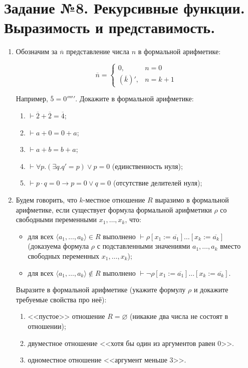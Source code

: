 \documentclass[10pt,a4paper,oneside]{article}
\begin{document}
\section*{Задание №8. Рекурсивные функции. Выразимость и представимость.}
\begin{enumerate}

\item Обозначим за $\overline{n}$ представление числа $n$ в формальной арифметике: %

$$\overline{n} = \left\{\begin{array}{ll}0, &n = 0\\
           \left(\overline{k}\right)', & n=k+1\end{array}\right.$$

Например, $\overline{5} = 0'''''$. Докажите в формальной арифметике:
\begin{enumerate}
\item $\vdash \overline{2} + \overline{2} = \overline{4}$;
\item $\vdash a + 0 = 0 + a$;
\item $\vdash a + b = b + a$;
\item $\vdash \forall p.(\exists q.q' = p) \vee p = 0$ (единственность нуля);
\item $\vdash p \cdot q = 0 \rightarrow p = 0 \vee q = 0$ (отсутствие делителей нуля);
\end{enumerate}

\item Будем говорить, что $k$-местное отношение $R$ выразимо в формальной арифметике,
если существует формула формальной арифметики $\rho$ со свободными переменными $x_1, \dots, x_k$, что:
\begin{itemize}
\item для всех $\langle a_1, \dots, a_k \rangle \in R$ выполнено $\vdash\rho[x_1 := \overline{a_1}]\dots[x_k := \overline{a_k}]$
(доказуема формула $\rho$ с подставленными значениями $a_1, \dots, a_k$ вместо свободных переменных $x_1, \dots, x_k$);
\item для всех $\langle a_1, \dots, a_k \rangle \notin R$ выполнено $\vdash\neg\rho[x_1 := \overline{a_1}]\dots[x_k := \overline{a_k}]$.
\end{itemize}

Выразите в формальной арифметике (укажите формулу $\rho$ и докажите требуемые свойства про неё):
\begin{enumerate}
\item <<пустое>> отношение $R = \varnothing$ (никакие два числа не состоят в отношении);
\item двуместное отношение <<хотя бы один из аргументов равен 0>>.
\item одноместное отношение <<аргумент меньше 3>>.
\end{enumerate}


\end{enumerate}
\end{document}
